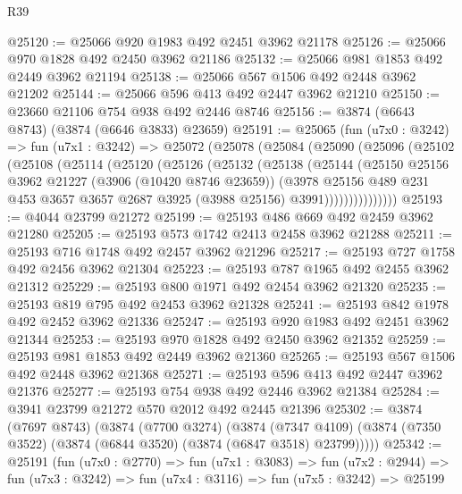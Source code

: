 \begin{lexlean}{R39}
\begin{coremodule}
@25120 := @25066 @920 @1983 @492 @2451 @3962 @21178
@25126 := @25066 @970 @1828 @492 @2450 @3962 @21186
@25132 := @25066 @981 @1853 @492 @2449 @3962 @21194
@25138 := @25066 @567 @1506 @492 @2448 @3962 @21202
@25144 := @25066 @596 @413 @492 @2447 @3962 @21210
@25150 := @23660 @21106 @754 @938 @492 @2446 @8746
@25156 := @3874 (@6643 @8743) (@3874 (@6646 @3833) @23659)
@25191 := @25065
    (fun (u7x0 : @3242) =>
    fun (u7x1 : @3242) =>
    @25072
      (@25078
        (@25084
          (@25090
            (@25096
              (@25102
                (@25108
                  (@25114
                    (@25120
                      (@25126
                        (@25132
                          (@25138
                            (@25144
                              (@25150
                                @25156
                                @3962
                                @21227
                                (@3906 (@10420 @8746 @23659))
                                (@3978
                                  @25156
                                  @489
                                  @231
                                  @453
                                  @3657
                                  @3657
                                  @2687
                                  @3925
                                  (@3988 @25156)
                                  @3991)))))))))))))))
@25193 := @4044 @23799 @21272
@25199 := @25193 @486 @669 @492 @2459 @3962 @21280
@25205 := @25193 @573 @1742 @2413 @2458 @3962 @21288
@25211 := @25193 @716 @1748 @492 @2457 @3962 @21296
@25217 := @25193 @727 @1758 @492 @2456 @3962 @21304
@25223 := @25193 @787 @1965 @492 @2455 @3962 @21312
@25229 := @25193 @800 @1971 @492 @2454 @3962 @21320
@25235 := @25193 @819 @795 @492 @2453 @3962 @21328
@25241 := @25193 @842 @1978 @492 @2452 @3962 @21336
@25247 := @25193 @920 @1983 @492 @2451 @3962 @21344
@25253 := @25193 @970 @1828 @492 @2450 @3962 @21352
@25259 := @25193 @981 @1853 @492 @2449 @3962 @21360
@25265 := @25193 @567 @1506 @492 @2448 @3962 @21368
@25271 := @25193 @596 @413 @492 @2447 @3962 @21376
@25277 := @25193 @754 @938 @492 @2446 @3962 @21384
@25284 := @3941 @23799 @21272 @570 @2012 @492 @2445 @21396
@25302 := @3874
    (@7697 @8743)
    (@3874
      (@7700 @3274)
      (@3874
        (@7347 @4109)
        (@3874 (@7350 @3522) (@3874 (@6844 @3520) (@3874 (@6847 @3518) @23799)))))
@25342 := @25191
    (fun (u7x0 : @2770) =>
    fun (u7x1 : @3083) =>
    fun (u7x2 : @2944) =>
    fun (u7x3 : @3242) =>
    fun (u7x4 : @3116) =>
    fun (u7x5 : @3242) =>
    @25199

\end{coremodule}
\end{lexlean}
